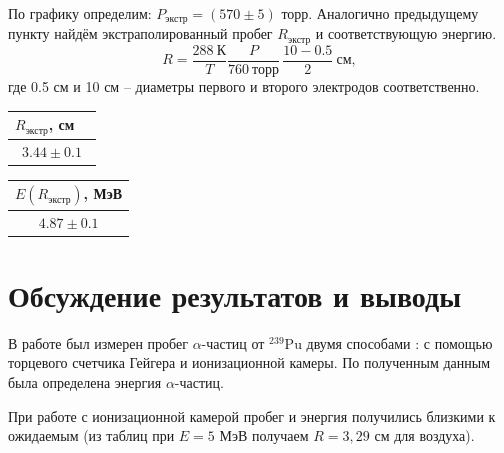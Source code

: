 \documentclass[a4paper,12pt]{article} %
\begin{document}
		По графику определим: $P_\text{экстр} = (570 \pm 5)$ торр. Аналогично предыдущему пункту найдём экстраполированный пробег $R_\text{экстр}$ и соответствующую энергию.
		\begin{equation*}
			R = \frac{288 \ \text{К}}{T}\frac{P}{760 \ \text{торр}}\, \frac{10 - 0.5}{2} \ \text{см},
		\end{equation*}
		где 0.5 см и 10 см -- диаметры первого и второго электродов соответственно.
		\begin{table}[h!]
			\begin{floatrow}
				{\begin{tabular}{|c|}
						\hline
						$R_\text{экстр}$, см $\ \ \ $ \\ \hline
						$3.44 \pm 0.1$         \\ \hline
				\end{tabular}}
				{\begin{tabular}{|c|}
						\hline
						$E(R_\text{экстр})$, МэВ \\ \hline
						$4.87 \pm 0.1 $            \\ \hline
				\end{tabular}}        
			\end{floatrow}
		\end{table}
		
\section{Обсуждение результатов и выводы}
	
	В работе был измерен пробег $\alpha$-частиц от $ ^{239}  $Pu двумя способами :
	с помощью торцевого счетчика Гейгера и ионизационной камеры. 
	По полученным данным была определена энергия $\alpha$-частиц.

	При работе с ионизационной камерой пробег и энергия получились близкими к ожидаемым (из таблиц при $ E = 5 $ МэВ получаем $ R = 3,29 $ см для воздуха).
\end{document}
